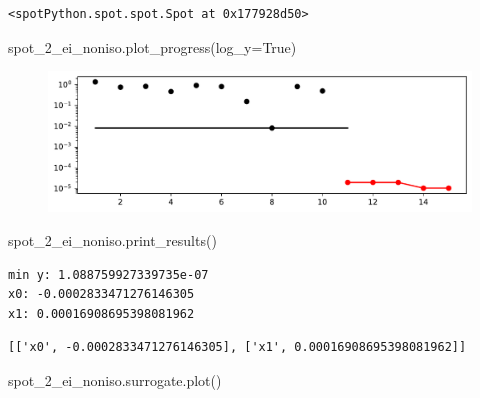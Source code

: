 \documentclass[
  letterpaper,
  DIV=11,
  numbers=noendperiod]{scrreprt}
\newenvironment{Shaded}{\begin{snugshade}}{\end{snugshade}}
\newcommand{\NormalTok}[1]{\textcolor[rgb]{0.00,0.23,0.31}{#1}}
\newcommand{\OperatorTok}[1]{\textcolor[rgb]{0.37,0.37,0.37}{#1}}
\newcommand{\VariableTok}[1]{\textcolor[rgb]{0.07,0.07,0.07}{#1}}
\begin{document}
\begin{verbatim}
<spotPython.spot.spot.Spot at 0x177928d50>
\end{verbatim}

\begin{Shaded}
\begin{Highlighting}[]
\NormalTok{spot\_2\_ei\_noniso.plot\_progress(log\_y}\OperatorTok{=}\VariableTok{True}\NormalTok{)}
\end{Highlighting}
\end{Shaded}

\begin{figure}[H]

{\centering \includegraphics{012_num_spot_ei_files/figure-pdf/cell-15-output-1.pdf}

}

\end{figure}

\begin{Shaded}
\begin{Highlighting}[]
\NormalTok{spot\_2\_ei\_noniso.print\_results()}
\end{Highlighting}
\end{Shaded}

\begin{verbatim}
min y: 1.088759927339735e-07
x0: -0.0002833471276146305
x1: 0.00016908695398081962
\end{verbatim}

\begin{verbatim}
[['x0', -0.0002833471276146305], ['x1', 0.00016908695398081962]]
\end{verbatim}

\begin{Shaded}
\begin{Highlighting}[]
\NormalTok{spot\_2\_ei\_noniso.surrogate.plot()}
\end{Highlighting}
\end{Shaded}
\end{document}
